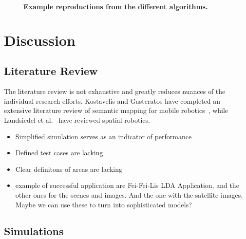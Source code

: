 \documentclass[twocolumn,letterpaper]{IEEEAerospaceCLS}  %
\begin{document}
\begin{figure}
    \centering
    \caption{\bf{
        Example reproductions from the different algorithms. 
    }}
    \label{fig:SampRes}
\end{figure}
\section{Discussion} \label{sec:Disc}
\subsection{Literature Review} \label{ssec:DiscLit}
The literature review is not exhaustive and greatly reduces nuances of the individual research efforts. Kostavelis and Gasteratos have completed an extensive literature review of semantic mapping for mobile robotics~\cite{kostavelis_semantic_2015}, while Landsiedel et al.~\cite{landsiedel_review_2017} have reviewed spatial robotics.
\begin{itemize}
    \item Simplified simulation serves as an indicator of performance
    \item Defined test cases are lacking
    \item Clear definitons of areas are lacking
    \item example of successful application are Fei-Fei-Lis LDA Application, and the other ones for the scenes and images. And the one with the satellite images. Maybe we can use these to turn into sophisticated models?
\end{itemize}

\subsection{Simulations} \label{ssec:DiscSim}
\end{document}
